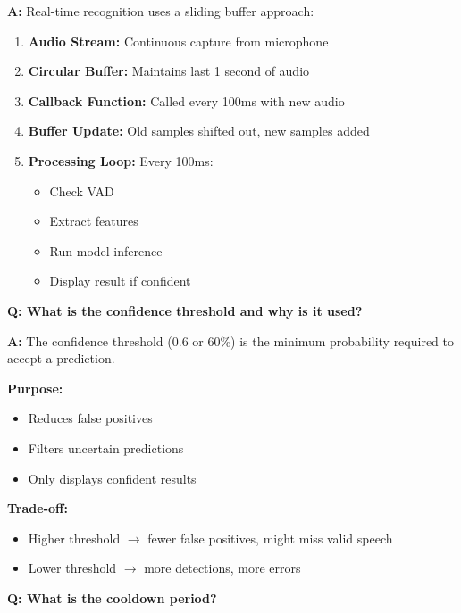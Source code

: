 \documentclass[a4paper,12pt]{article}
\newcommand{\vivaQ}[1]{\textcolor{questioncolor}{\textbf{Q: #1}}}
\newcommand{\vivaA}[1]{\textcolor{answercolor}{\textbf{A:}} #1}
\begin{document}
\vivaA{Real-time recognition uses a sliding buffer approach:

\begin{enumerate}
    \item \textbf{Audio Stream:} Continuous capture from microphone
    \item \textbf{Circular Buffer:} Maintains last 1 second of audio
    \item \textbf{Callback Function:} Called every 100ms with new audio
    \item \textbf{Buffer Update:} Old samples shifted out, new samples added
    \item \textbf{Processing Loop:} Every 100ms:
    \begin{itemize}
        \item Check VAD
        \item Extract features
        \item Run model inference
        \item Display result if confident
    \end{itemize}
\end{enumerate}}

\vspace{0.5cm}

\vivaQ{What is the confidence threshold and why is it used?}

\vivaA{The confidence threshold (0.6 or 60\%) is the minimum probability required to accept a prediction.

\textbf{Purpose:}
\begin{itemize}
    \item Reduces false positives
    \item Filters uncertain predictions
    \item Only displays confident results
\end{itemize}

\textbf{Trade-off:}
\begin{itemize}
    \item Higher threshold $\rightarrow$ fewer false positives, might miss valid speech
    \item Lower threshold $\rightarrow$ more detections, more errors
\end{itemize}}

\vspace{0.5cm}

\vivaQ{What is the cooldown period?}
\end{document}
